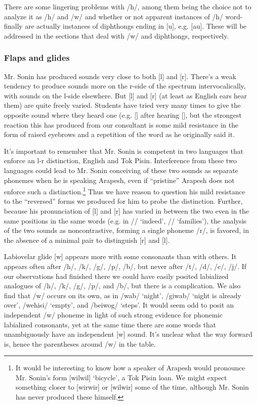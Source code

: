 \documentclass[pdftex,12pt,letterpaper]{article}
\let\ipa\textipa
\def\sw{\ipa{\super w}}
\begin{document}
 There are some lingering problems with /h\sw/, among them being the choice not to analyze it as /h/ and /w/ and whether or not apparent instances of /h\sw/ word-finally are actually instances of diphthongs ending in [u], e.g. [au]. These will be addressed in the sections that deal with /w/ and diphthongs, respectively. 

 \subsubsection{Flaps and glides}

 Mr. Sonin has produced sounds very close to both {[l]} and {[r]}. There's a weak tendency to produce sounds more on the r-side of the spectrum intervocalically, with sounds on the l-side elsewhere. But {[l]} and {[r]} (at least as English ears hear them) are quite freely varied. Students have tried very many times to give the opposite sound where they heard one (e.g. {[\ipa{@lmatok\sw}]} after hearing {[\ipa{@rmatok\sw}]}, but the strongest reaction this has produced from our consultant is some mild resistance in the form of raised eyebrows and a repetition of the word as he originally said it.

 It's important to remember that Mr. Sonin is competent in two languages that enforce an l-r distinction, English and Tok Pisin. Interference from these two languages could lead to Mr. Sonin conceiving of these two sounds as separate phonemes when he is speaking Arapesh, even if ``pristine'' Arapesh does not enforce such a distinction.\footnote{It would be interesting to know how a speaker of Arapesh would pronounce Mr. Sonin's form [wilwil] `bicycle', a Tok Pisin loan. We might expect something closer to [wirwir] or [wilwir] some of the time, although Mr. Sonin has never produced these himself.} Thus we have reason to question his mild resistance to the ``reversed'' forms we produced for him to probe the distinction. Further, because his pronunciation of {[l]} and {[r]} has varied in between the two even in the same positions in the same words (e.g. in /\ipa{@d1r}/ `indeed', /\ipa{n1r1g@s}/ `families'), the analysis of the two sounds as noncontrastive, forming a single phoneme /r/, is favored, in the absence of a minimal pair to distinguish {[r]} and {[l]}.

 Labiovelar glide [w] appears more with some consonants than with others. It appears often after /h/, /k/, /g/, /p/, /b/, but never after /t/, /d/, /c/, /j/. If our observations had finished there we could have easily posited labialized analogues of /h/, /k/, /g/, /p/, and /b/, but there is a complication. We also find that /w/ occurs on its own, as in /wab/ `night', /giwab/ `night is already over', /wehisi/ `empty', and /beiwog\sw/ `steps'. It would seem odd to posit an independent /w/ phoneme in light of such strong evidence for phonemic labialized consonants, yet at the same time there are some words that unambiguously have an independent [w] sound. It's unclear what the way forward is, hence the parentheses around /w/ in the table.
  
\end{document}
